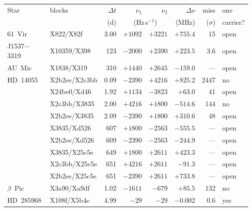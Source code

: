 \begin{tabular}{@{}l@{~}l@{\,}r@{\,}r@{\,}r@{\,}r@{\,}r@{~}l@{}}
\hline
Star & blocks & $\Delta t$ & $\dot\nu_1$ & $\dot\nu_2$ & $\Delta\nu$ & miss & one \\
 & & (d) & \multicolumn{2}{c}{(Hz\,s$^{-1}$)} & (MHz) & ($\sigma$) & carrier? \\
\hline
61~Vir & X822/X82f & 3.00 & $+1092$ & $+3221$ & $+755.4$ & 15 & open \\
J1537$-$3319 & X10359/X398 & 123 & $-2000$ & $+2390$ & $+223.5$ & 3.6 & open \\
AU~Mic & X1838/X319 & 310 & $+1440$ & $+2645$ & $-159.0$ & --- & open \\
HD~14055 & X2b2ee/X2c3bb & 0.09 & $-2390$ & $+4216$ & $+825.2$ & 2447 & no \\
 & X24be0/Xd46 & 1.92 & $+1134$ & $-3823$ & $+63.0$ & 41 & open \\
 & X2c3bb/X3835 & 2.00 & $+4216$ & $+1800$ & $-514.6$ & 144 & no \\
 & X2b2ee/X3835 & 2.09 & $-2390$ & $+1800$ & $+310.6$ & 48 & open \\
 & X3835/Xd526 & 607 & $+1800$ & $-2563$ & $-555.5$ & --- & open \\
 & X2b2ee/Xd526 & 609 & $-2390$ & $-2563$ & $-244.9$ & --- & open \\
 & X3835/X25c5e & 649 & $+1800$ & $+2611$ & $+423.3$ & --- & open \\
 & X2c3bb/X25c5e & 651 & $+4216$ & $+2611$ & $-91.3$ & --- & open \\
 & X2b2ee/X25c5e & 651 & $-2390$ & $+2611$ & $+733.8$ & --- & open \\
$\beta$~Pic & X3a90/Xa9df & 1.02 & $-1611$ & $-679$ & $+85.5$ & 132 & no \\
\hline
HD~285968 & X108f/X5b4e & 4.99 & $-29$ & $-29$ & $-0.002$ & 0.6 & yes \\
\hline
\end{tabular}
